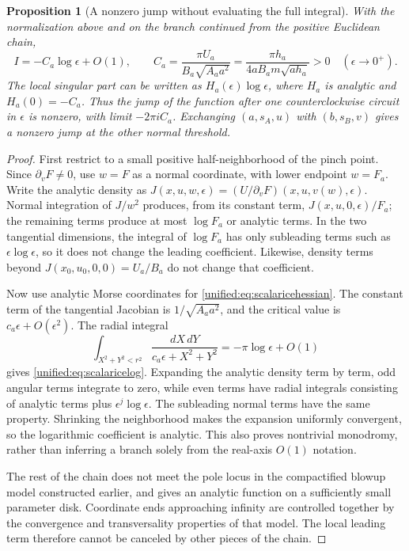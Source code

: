 \documentclass[11pt,a4paper,oneside]{article}
\theoremstyle{plain}
\newtheorem{proposition}[theorem]{Proposition}
\theoremstyle{definition}
\theoremstyle{remark}
\numberwithin{equation}{section}
\begin{document}
\begin{proposition}[A nonzero jump without evaluating the full integral]\label{unified:prop:scalaricelog}
With the normalization above and on the branch continued from the positive Euclidean chain,
\begin{equation}\label{unified:eq:scalaricelog}
 I=-C_a\log\epsilon+O(1),\qquad
 C_a=\frac{\pi U_a}{B_a\sqrt{A_aa^2}}
     =\frac{\pi h_a}{4a B_a m\sqrt{a h_a}}>0
 \quad(\epsilon\longrightarrow0^+).
\end{equation}
The local singular part can be written as $H_a(\epsilon)\log\epsilon$,
where $H_a$ is analytic and $H_a(0)=-C_a$.
Thus the jump of the function after one counterclockwise circuit in $\epsilon$ is nonzero, with limit $-2\pi iC_a$.
Exchanging $(a,s_A,u)$ with $(b,s_B,v)$ gives a nonzero jump at the other normal threshold.
\end{proposition}
\begin{proof}
First restrict to a small positive half-neighborhood of the pinch point.
Since $\partial_vF\ne0$, use $w=F$ as a normal coordinate,
with lower endpoint $w=F_a$. Write the analytic density as
$J(x,u,w,\epsilon)=(U/\partial_vF)(x,u,v(w),\epsilon)$.
Normal integration of $J/w^2$ produces, from its constant term,
$J(x,u,0,\epsilon)/F_a$;
the remaining terms produce at most $\log F_a$ or analytic terms.
In the two tangential dimensions, the integral of $\log F_a$ has only subleading terms such as
$\epsilon\log\epsilon$, so it does not change the leading coefficient.
Likewise, density terms beyond $J(x_0,u_0,0,0)=U_a/B_a$ do not change that coefficient.

Now use analytic Morse coordinates for \eqref{unified:eq:scalaricehessian}.
The constant term of the tangential Jacobian is $1/\sqrt{A_aa^2}$,
and the critical value is $c_a\epsilon+O(\epsilon^2)$.
The radial integral
\[
 \int_{X^2+Y^2<r^2}
       \frac{dX\,dY}{c_a\epsilon+X^2+Y^2}
       =-\pi\log\epsilon+O(1)
\]
gives \eqref{unified:eq:scalaricelog}.
Expanding the analytic density term by term, odd angular terms integrate to zero,
while even terms have radial integrals consisting of analytic terms plus $\epsilon^j\log\epsilon$.
The subleading normal terms have the same property.
Shrinking the neighborhood makes the expansion uniformly convergent, so the logarithmic coefficient is analytic.
This also proves nontrivial monodromy, rather than inferring a branch solely from the real-axis $O(1)$ notation.

The rest of the chain does not meet the pole locus in the compactified blowup model constructed earlier,
and gives an analytic function on a sufficiently small parameter disk. Coordinate ends approaching infinity
are controlled together by the convergence and transversality properties of that model.
The local leading term therefore cannot be canceled by other pieces of the chain.
\end{proof}
\end{document}
